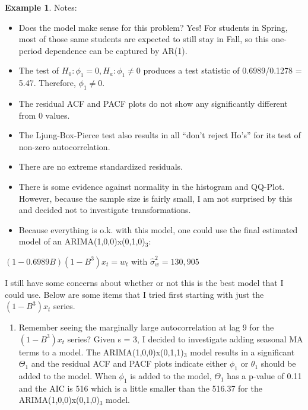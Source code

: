 \documentclass[
]{book}
\providecommand{\tightlist}{%
  \setlength{\itemsep}{0pt}\setlength{\parskip}{0pt}}
\theoremstyle{definition}
\theoremstyle{definition}
\newtheorem{example}{Example}[chapter]
\theoremstyle{definition}
\theoremstyle{definition}
\theoremstyle{remark}
\begin{document}
\begin{example}
Notes:

\begin{itemize}
\tightlist
\item
  Does the model make sense for this problem? Yes! For students in Spring, most of those same students are expected to still stay in Fall, so this one-period dependence can be captured by AR(1).
\item
  The test of \(H_0:\phi_1=0, H_a:\phi_1\ne 0\) produces a test statistic of 0.6989/0.1278 = 5.47. Therefore, \(\phi_1\ne 0.\)
\item
  The residual ACF and PACF plots do not show any significantly different from 0 values.\\
\item
  The Ljung-Box-Pierce test also results in all ``don't reject Ho's'' for its test of non-zero autocorrelation.\\
\item
  There are no extreme standardized residuals.\\
\item
  There is some evidence against normality in the histogram and QQ-Plot. However, because the sample size is fairly small, I am not surprised by this and decided not to investigate transformations.\\
\item
  Because everything is o.k. with this model, one could use the final estimated model of an ARIMA(1,0,0)x(0,1,0)\(_3\):
\end{itemize}

\((1-0.6989B)(1-B^3)x_t = w_t\) with \(\hat \sigma_w^2=130,905\)
\end{example}

I still have some concerns about whether or not this is the best model that I could use. Below are some items that I tried first starting with just the \((1-B^3)x_t\) series.

\begin{enumerate}
\def\labelenumi{\arabic{enumi}.}
\tightlist
\item
  Remember seeing the marginally large autocorrelation at lag 9 for the \((1-B^3)x_t\) series? Given s = 3, I decided to investigate adding seasonal MA terms to a model. The ARIMA(1,0,0)x(0,1,1)\(_3\) model results in a significant \(\Theta_1\) and the residual ACF and PACF plots indicate either \(\phi_1\) or \(\theta_1\) should be added to the model. When \(\phi_1\) is added to the model, \(\Theta_1\) has a p-value of 0.11 and the AIC is 516 which is a little smaller than the 516.37 for the ARIMA(1,0,0)x(0,1,0)\(_3\) model.
\end{enumerate}
\end{document}
